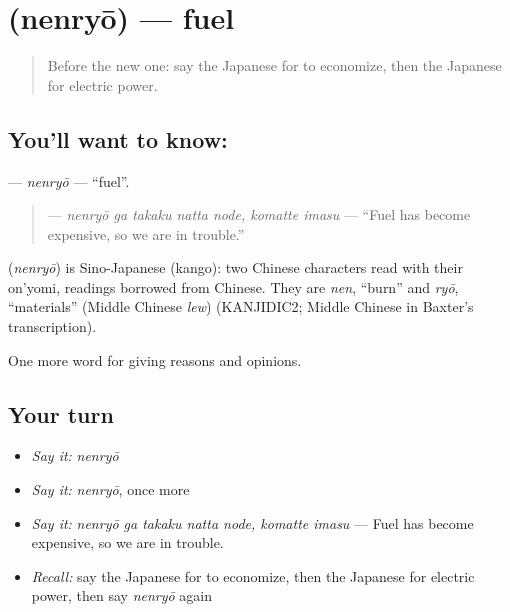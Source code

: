 \section[\texorpdfstring{\ja{ねんりょう} (nenryō)}{ねんりょう (nenryō)}]{ (nenryō) — fuel}

\label{lesson:JA-C337-nenryou}



\begin{quote}
Before the new one: say the Japanese for to economize, then the Japanese for electric power.
\end{quote}

\subsection*{You'll want to know: }
\textbf{} — \emph{nenryō} — \textquotedblleft{}fuel\textquotedblright{}.

\begin{quote}
\textbf{  } — \emph{nenryō ga takaku natta node, komatte imasu} — \textquotedblleft{}Fuel has become expensive, so we are in trouble.\textquotedblright{}
\end{quote}

\begin{cousinweb}
\textbf{} (\emph{nenryō}) is Sino-Japanese (kango): two Chinese characters read with their on'yomi, readings borrowed from Chinese. They are \emph{nen}, \textquotedblleft{}burn\textquotedblright{} and \emph{ryō}, \textquotedblleft{}materials\textquotedblright{} (Middle Chinese \emph{lew}) (KANJIDIC2; Middle Chinese in Baxter's transcription).
\end{cousinweb}

\begin{grammarlens}[title={What you've built}]
One more word for giving reasons and opinions.
\end{grammarlens}

\subsection*{Your turn}
\begin{itemize}
\raggedright
  \item \emph{Say it:} \emph{nenryō}
  \item \emph{Say it:} \emph{nenryō}, once more
  \item \emph{Say it:} \emph{nenryō ga takaku natta node, komatte imasu} — Fuel has become expensive, so we are in trouble.
  \item \emph{Recall:} say the Japanese for to economize, then the Japanese for electric power, then say \emph{nenryō} again
\end{itemize}

